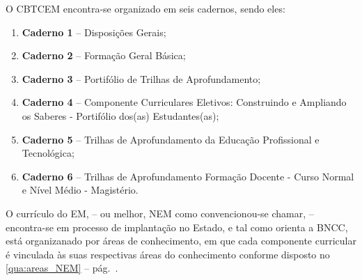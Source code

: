 O \ac{CBTCEM} encontra-se organizado em seis cadernos, sendo eles:
\begin{enumerate}[label=\Roman *)]
		\item \textbf{Caderno 1} -- Disposições Gerais;
		\item \textbf{Caderno 2} -- Formação Geral Básica;
		\item \textbf{Caderno 3} -- Portifólio de Trilhas de Aprofundamento;
		\item \textbf{Caderno 4} -- Componente Curriculares Eletivos: Construindo e Ampliando os Saberes - Portifólio dos(as) Estudantes(as);
		\item \textbf{Caderno 5} -- Trilhas de Aprofundamento da Educação Profissional e Tecnológica;
		\item \textbf{Caderno 6} -- Trilhas de Aprofundamento Formação Docente - Curso Normal e Nível Médio - Magistério.
\end{enumerate}

O currículo do \ac{EM}, -- ou melhor, \ac{NEM} como convencionou-se chamar, -- encontra-se em processo de implantação no Estado, e tal como orienta a \ac{BNCC}, está organizanado por áreas de conhecimento, em que cada componente curricular é vinculada às suas respectivas áreas do conhecimento conforme disposto no \autoref{qua:areas_NEM} -- pág.~\pageref{qua:areas_NEM}.

